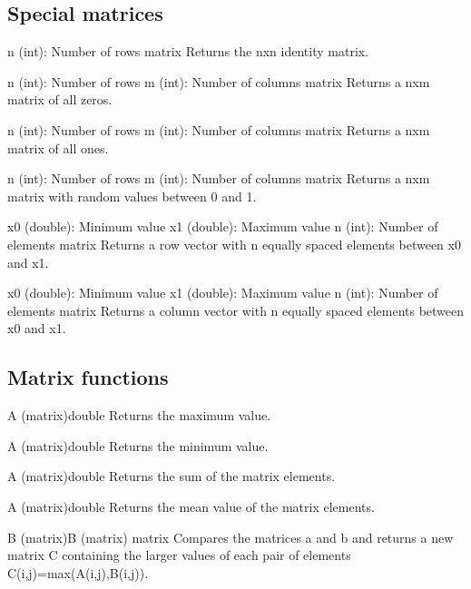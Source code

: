 \funcrefpagebreak
{}
\subsection{Special matrices}

{n (int): Number of rows}
{matrix}
{Returns the nxn identity matrix.}

{n (int): Number of rows\newline
m (int): Number of columns}
{matrix}
{Returns a nxm matrix of all zeros.}

{n (int): Number of rows\newline
m (int): Number of columns}
{matrix}
{Returns a nxm matrix of all ones.}

{n (int): Number of rows\newline
m (int): Number of columns}
{matrix}
{Returns a nxm matrix with random values between 0 and 1.}

{x0 (double): Minimum value\newline
x1 (double): Maximum value\newline
n (int): Number of elements}
{matrix}
{Returns a row vector with n equally spaced elements between x0 and x1.}

{x0 (double): Minimum value\newline
x1 (double): Maximum value\newline
n (int): Number of elements}
{matrix}
{Returns a column vector with n equally spaced elements between x0 and x1.}

\subsection{Matrix functions}

{A (matrix)}{double}
{Returns the maximum value.}

{A (matrix)}{double}
{Returns the minimum value.}

{A (matrix)}{double}
{Returns the sum of the matrix elements.}

{A (matrix)}{double}
{Returns the mean value of the matrix elements.}

{B (matrix)\newline B (matrix)}
{matrix}
{Compares the matrices a and b and returns a new matrix C containing the larger values of each pair of 
elements C(i,j)=max(A(i,j),B(i,j)). }

